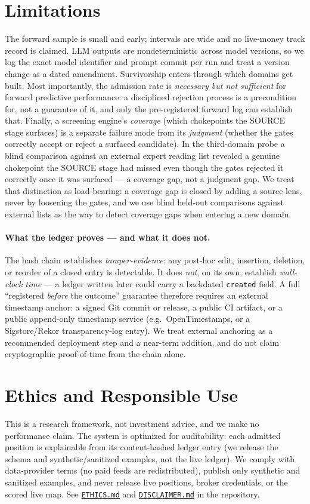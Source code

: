 \documentclass[11pt]{article}
\begin{document}
\section{Limitations}
The forward sample is small and early; intervals are wide and no live-money track record is claimed.
LLM outputs are nondeterministic across model versions, so we log the exact model identifier and
prompt commit per run and treat a version change as a dated amendment. Survivorship enters through
which domains get built. Most importantly, the admission rate is \emph{necessary but not sufficient}
for forward predictive performance: a disciplined rejection process is a precondition for, not a
guarantee of it, and only the pre-registered forward log can establish that. Finally, a screening engine's
\emph{coverage} (which chokepoints the SOURCE stage surfaces) is a separate failure mode from its
\emph{judgment} (whether the gates correctly accept or reject a surfaced candidate). In the
third-domain probe a blind comparison against an external expert reading list revealed a genuine
chokepoint the SOURCE stage had missed even though the gates rejected it correctly once it was
surfaced --- a coverage gap, not a judgment gap. We treat that distinction as load-bearing: a coverage
gap is closed by adding a source lens, never by loosening the gates, and we use blind held-out
comparisons against external lists as the way to detect coverage gaps when entering a new domain.

\paragraph{What the ledger proves --- and what it does not.} The hash chain establishes
\emph{tamper-evidence}: any post-hoc edit, insertion, deletion, or reorder of a closed entry is
detectable. It does \emph{not}, on its own, establish \emph{wall-clock time} --- a ledger written
later could carry a backdated \texttt{created} field. A full ``registered \emph{before} the outcome''
guarantee therefore requires an external timestamp anchor: a signed Git commit or release, a public
CI artifact, or a public append-only timestamp service (e.g.\ OpenTimestamps, or a Sigstore/Rekor
transparency-log entry). We treat external anchoring as a recommended deployment step and a near-term
addition, and do not claim cryptographic proof-of-time from the chain alone.

\section{Ethics and Responsible Use}
This is a research framework, not investment advice, and we make no performance claim. The system is
optimized for auditability: each admitted position is explainable from its content-hashed ledger
entry (we release the schema and synthetic/sanitized examples, not the live ledger). We comply with data-provider terms (no paid feeds are redistributed), publish only synthetic
and sanitized examples, and never release live positions, broker credentials, or the scored live map.
See \href{https://github.com/yixingz3/qpop/blob/main/ETHICS.md}{\texttt{ETHICS.md}} and
\href{https://github.com/yixingz3/qpop/blob/main/DISCLAIMER.md}{\texttt{DISCLAIMER.md}} in the repository.
\end{document}

